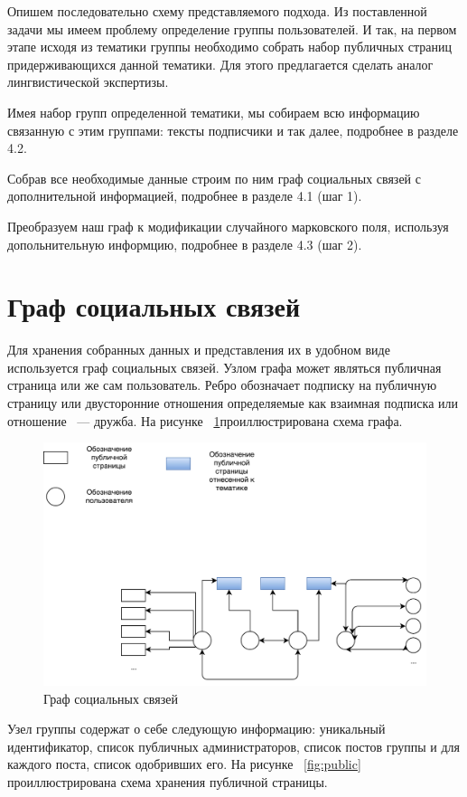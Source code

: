 \documentclass[annotation,times,page4]{itmo-student-thesis}
\begin{document}
Опишем последовательно схему представляемого подхода. Из поставленной задачи мы имеем проблему определение группы пользователей. И так, на первом этапе исходя из тематики группы необходимо собрать набор публичных страниц придерживающихся данной тематики. Для этого предлагается сделать аналог лингвистической экспертизы. 

Имея набор групп определенной тематики, мы собираем всю информацию связанную с этим группами: тексты подписчики и так далее, подробнее в разделе 4.2.

Собрав все необходимые данные строим по ним граф социальных связей с дополнительной информацией, подробнее в разделе 4.1 (шаг 1).

Преобразуем наш граф к модификации случайного марковского поля, используя допольнительную информцию, подробнее в разделе 4.3 (шаг 2).

\section{Граф социальных связей}
Для хранения собранных данных и представления их в удобном виде используется граф социальных связей.
Узлом графа может являться публичная страница или же сам пользователь. Ребро обозначает подписку на публичную страницу или двусторонние отношения определяемые как взаимная подписка или отношение ~--- дружба. На рисунке ~\ref{fig:grapth}проиллюстрирована схема графа.

\begin{figure}[!h]
\caption{Граф социальных связей}
\label{fig:grapth}
\centering
\includegraphics[width=\textwidth]{figs/graph.pdf}
\end{figure}

Узел группы содержат о себе следующую информацию: уникальный идентификатор, список публичных администраторов, список постов группы и для каждого поста, список одобривших его. На рисунке ~\ref{fig:public} проиллюстрирована схема хранения публичной страницы.
\end{document}
